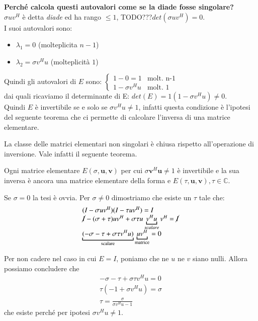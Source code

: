 \begin{notes}\textbf{Perch\'e calcola questi autovalori come se la diade fosse singolare?}\\
  $\sigma u v^{H}$ \`e detta \emph{diade} ed ha rango $\leq 1$,
  TODO???$det(\sigma u v^{H}) = 0$.\\
I suoi autovalori sono:
\begin{itemize}
\item $\lambda_1 = 0$  (molteplicita $n-1$)
\item $\lambda_2 = \sigma v^{H} u$   (molteplicit\`a $1$)
\end{itemize}

Quindi gli autovalori di $E$ sono:
$\left\{ 
 \begin{array}{ll}
 1-0 = 1            & \text{molt. n-1} \\
 1 - \sigma v^{H} u & \text{molt. 1}
\end{array}
\right.$\\
dai quali ricaviamo il determinante di E: $det(E) = 1 (1 - \sigma v^H
u) \neq 0$.\\
Quindi $E$ \`e invertibile se e solo se $\sigma v^{H}u \neq 1$, infatti
questa condizione \`e l'ipotesi del seguente teorema che ci permette di
calcolare l'inversa di una matrice elementare.
\end{notes}

La classe delle matrici elementari non singolari \`e chiusa rispetto
all'operazione di inversione. Vale infatti il seguente teorema.

\begin{theo}
\label{th:eleminversa}
  Ogni matrice elementare $E(\sigma, \mathbf{u, v})$ per cui $\sigma
  \mathbf{v}^H \mathbf{u} \neq 1$ \`e invertibile e la sua inversa \`e
  ancora una matrice elementare della forma e $E(\tau, \mathbf{u, v}),
  \tau \in \mathbb{C}$.
\end{theo}

\begin{thproof}
Se $\sigma=0$ la tesi \`e ovvia. Per $\sigma \neq 0$ dimostriamo che
esiste un $\tau$ tale che:
\[\begin{array}{ll}
 (I - \sigma uv^{H})(I - \tau u v^{H}) = I \\
 \cancel{I} - (\sigma + \tau) uv^{H} + \sigma \tau u 
 \underbracket{v^{H} u}_{scalare} v^{H} = \cancel{I} \\
 \underbracket{(-\sigma - \tau +  \sigma \tau v^{H}
   u)}_{\text{scalare}} \underbracket{uv^{H}}_{\text{matrice}} = 0 
\end{array}\]

Per non cadere nel caso in cui $E=I$, poniamo che ne $u$ ne $v$ siano
nulli. Allora possiamo concludere che
\[\begin{array}{ll}
 - \sigma - \tau + \sigma\tau v^{H} u = 0 \\
 \tau(-1 + \sigma v^{H}u) = \sigma \\
 \tau = \frac{\sigma}{\sigma v^{H}u-1} 
\end{array}\]
che esiste perch\'e per ipotesi $\sigma v^{H}u \neq 1$.
\end{thproof}

